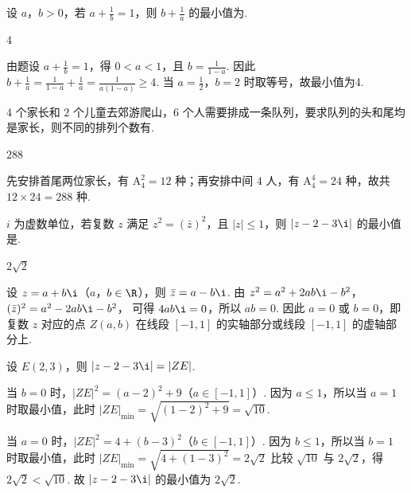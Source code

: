 \documentclass[UTF8,a4paper,oneside,11pt]{ctexbook}
\begin{document}
\begin{problem}
设 \(a\)，\(b>0\)，若 \(a+\frac1b=1\)，则 \(b+\frac1a\) 的最小值为\fillinblank{}.
\end{problem}

\begin{answer}
\(4\)
\end{answer}

\begin{solution}
由题设 \(a+\frac1b=1\)，得 \(0<a<1\)，且 \(b=\frac1{1-a}\). 因此
\(b+\frac1a=\frac1{1-a}+\frac1a=\frac1{a(1-a)}\ge4\).
当 \(a=\frac12\)，\(b=2\) 时取等号，故最小值为4.
\end{solution}

\begin{problem}
\(4\) 个家长和 \(2\) 个儿童去郊游爬山，\(6\) 个人需要排成一条队列，要求队列的头和尾均是家长，则不同的排列个数有\fillinblank{}.
\end{problem}

\begin{answer}
\(288\)
\end{answer}

\begin{solution}
先安排首尾两位家长，有 \(\mathrm A_4^2=12\) 种；再安排中间 \(4\) 人，有 \(\mathrm A_4^4=24\) 种，故共 \(12\times24=288\) 种.
\end{solution}

\begin{problem}
\(i\) 为虚数单位，若复数 \(z\) 满足 \(z^2=(\bar z)^2\)，且 \(|z|\le1\)，则 \(|z-2-3\i|\) 的最小值是\fillinblank{}.
\end{problem}

\begin{answer}
\(2\sqrt2\)
\end{answer}

\begin{solution}
设 \(z=a+b\i\)（\(a\)，\(b\in\R\)），则 \(\bar z=a-b\i\). 由
\(z^2=a^2+2ab\i-b^2\)，\((\bar z)^2=a^2-2ab\i-b^2\)，
可得 \(4ab\i=0\)，所以 \(ab=0\).
因此 \(a=0\) 或 \(b=0\)，即复数 \(z\) 对应的点 \(Z(a,b)\) 在线段 \([-1,1]\) 的实轴部分或线段 \([-1,1]\) 的虚轴部分上.

设 \(E(2,3)\)，则 \(|z-2-3\i|=|ZE|\).

当 \(b=0\) 时，\(|ZE|^2=(a-2)^2+9\)（\(a\in[-1,1]\)）. 因为 \(a\le1\)，所以当 \(a=1\) 时取最小值，此时 \(|ZE|_{\min}=\sqrt{(1-2)^2+9}=\sqrt{10}\).

当 \(a=0\) 时，\(|ZE|^2=4+(b-3)^2\)（\(b\in[-1,1]\)）. 因为 \(b\le1\)，所以当 \(b=1\) 时取最小值，此时
\(
|ZE|_{\min}=\sqrt{4+(1-3)^2}=2\sqrt2
\)
比较 \(\sqrt{10}\) 与 \(2\sqrt2\)，得 \(2\sqrt2<\sqrt{10}\).
故 \(|z-2-3\i|\) 的最小值为 \(2\sqrt2\).
\end{solution}
\end{document}
